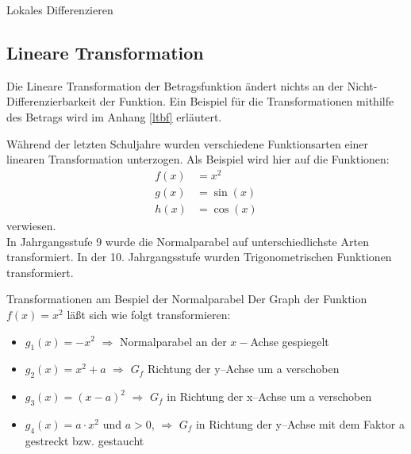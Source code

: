\begin{section}{Lokales Differenzieren}
\subsection{Lineare Transformation}
\begin{bem*}{}
Die Lineare Transformation der Betragsfunktion ändert nichts an der Nicht-Differenzierbarkeit der Funktion. Ein Beispiel für die Transformationen mithilfe des Betrags wird im Anhang \ref{ltbf} erläutert.
\end{bem*}
Während der letzten Schuljahre wurden verschiedene Funktionsarten einer linearen Transformation unterzogen. Als Beispiel wird hier auf die Funktionen: 
 \begin{equation*}
    \begin{split}
        f(x) &= x^2\\
        g(x) &= \sin{(x)}\\
        h(x) &= \cos{(x)}
    \end{split}
\end{equation*}
verwiesen.\\ 
In Jahrgangsstufe 9 wurde die Normalparabel auf unterschiedlichste Arten transformiert. In der 10. Jahrgangsstufe wurden Trigonometrischen Funktionen transformiert.
\begin{bsp*}{Transformationen am Bespiel der Normalparabel}{}
Der Graph der Funktion $f(x) = x^2$ läßt sich wie folgt transformieren:
\begin{itemize}
\item $g_1(x) = -x^2$ $\Longrightarrow$ Normalparabel an der $x-$Achse gespiegelt
\item $g_2(x) =   x^2 +a$ $\Longrightarrow$ $G_f$  Richtung der y--Achse um a verschoben
\item $g_3(x) =(x-a)^2$ $\Longrightarrow$ $G_f$ in Richtung der x--Achse um a verschoben
\item $g_4(x) =a\cdot x^2$ und $a>0$, $\Longrightarrow$ $G_f$ in Richtung der y--Achse mit dem Faktor a gestreckt bzw. gestaucht
\end{itemize}
\end{bsp*}


\end{section}
